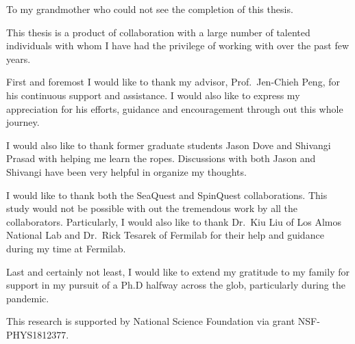 \documentclass[../main.tex]{subfiles}
\begin{document}
\begin{dedication}
	To my grandmother who could not see the completion of this thesis.
\end{dedication}

\begin{acknowledgments}
	This thesis is a product of collaboration with a large number of talented
	individuals with whom I have had the privilege of working with over the past
	few years.

	First and foremost I would like to thank my advisor, Prof.~Jen-Chieh Peng, for
	his continuous support and assistance. I would also like to express my
	appreciation for his efforts, guidance and encouragement through out this whole
	journey.

	I would also like to thank former graduate students Jason Dove and Shivangi
	Prasad with helping me learn the ropes. Discussions with both Jason and
	Shivangi have been very helpful in organize my thoughts.

	I would like to thank both the SeaQuest and SpinQuest collaborations.
	This study would not be possible with out the tremendous work by all the
	collaborators. Particularly, I would also like to thank Dr.~Kiu Liu of Los Almos
	National Lab and Dr.~Rick Tesarek of Fermilab for their help and guidance during
	my time at Fermilab.

	Last and certainly not least, I would like to extend my gratitude to my family
	for support in my pursuit of a Ph.D halfway across the glob, particularly
	during the pandemic.

	This research is supported by National Science Foundation via grant NSF-PHYS1812377.

\end{acknowledgments}
\end{document}

